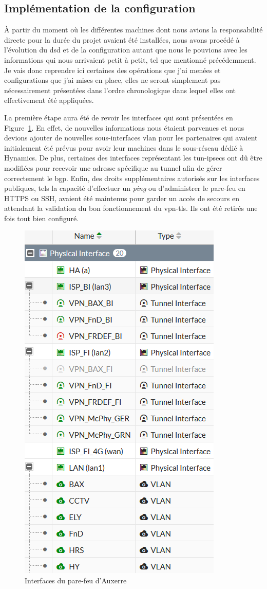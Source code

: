 \documentclass[12pt, oneside, a4paper, titlepage]{report}
\begin{document}
\subsection{Implémentation de la configuration}%
\label{sub:mission::main::implem}

À partir du moment où les différentes machines dont nous avions la
responsabilité directe pour la durée du projet avaient été installées, nous
avons procédé à l'évolution du \gls{dsd} et de la configuration autant que nous
le pouvions avec les informations qui nous arrivaient petit à petit, tel que
mentionné précédemment. Je vais donc reprendre ici certaines des opérations que
j'ai menées et configurations que j'ai mises en place, elles ne seront
simplement pas nécessairement présentées dans l'ordre chronologique dans lequel
elles ont effectivement été appliquées.

La première étape aura été de revoir les interfaces qui sont présentées en
Figure~\ref{fig:fgt-auxr/interfaces}. En effet, de nouvelles informations nous
étaient parvenues et nous devions ajouter de nouvelles sous-interfaces
\gls{vlan} pour les partenaires qui avaient initialement été prévus pour avoir
leur machines dans le sous-réseau dédié à Hynamics. De plus, certaines des
interfaces représentant les \glspl{tun-ipsec} ont dû être modifiées pour
recevoir une adresse spécifique au tunnel afin de gérer correctement le
\gls{bgp}. Enfin, des droits supplémentaires autorisés sur les interfaces
publiques, tels la capacité d'effectuer un \textit{ping} ou d'administrer le
pare-feu en HTTPS ou SSH, avaient été maintenus pour garder un accès de secours
en attendant la validation du bon fonctionnement du \gls{vpn-tls}. Ils ont été
retirés une fois tout bien configuré.

\begin{figure}[h!]
    \centering
    \includegraphics[width = 0.5\linewidth]{img/fgt-auxr/interfaces.png}
    \caption{Interfaces du pare-feu d'Auxerre}%
    \label{fig:fgt-auxr/interfaces}
\end{figure}
\end{document}
